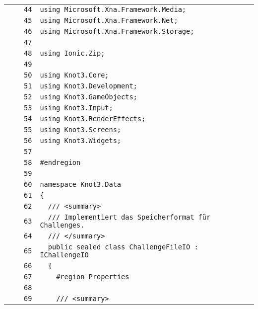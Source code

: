 \documentclass[a4paper,10pt]{article}
\begin{document}
\begin{longtable}[l]{lrrl}
\cellcolor{gray} &  & \verb~44~ & \verb~using Microsoft.Xna.Framework.Media;~\\
\cellcolor{gray} &  & \verb~45~ & \verb~using Microsoft.Xna.Framework.Net;~\\
\cellcolor{gray} &  & \verb~46~ & \verb~using Microsoft.Xna.Framework.Storage;~\\
\cellcolor{gray} &  & \verb~47~ & \verb~~\\
\cellcolor{gray} &  & \verb~48~ & \verb~using Ionic.Zip;~\\
\cellcolor{gray} &  & \verb~49~ & \verb~~\\
\cellcolor{gray} &  & \verb~50~ & \verb~using Knot3.Core;~\\
\cellcolor{gray} &  & \verb~51~ & \verb~using Knot3.Development;~\\
\cellcolor{gray} &  & \verb~52~ & \verb~using Knot3.GameObjects;~\\
\cellcolor{gray} &  & \verb~53~ & \verb~using Knot3.Input;~\\
\cellcolor{gray} &  & \verb~54~ & \verb~using Knot3.RenderEffects;~\\
\cellcolor{gray} &  & \verb~55~ & \verb~using Knot3.Screens;~\\
\cellcolor{gray} &  & \verb~56~ & \verb~using Knot3.Widgets;~\\
\cellcolor{gray} &  & \verb~57~ & \verb~~\\
\cellcolor{gray} &  & \verb~58~ & \verb~#endregion~\\
\cellcolor{gray} &  & \verb~59~ & \verb~~\\
\cellcolor{gray} &  & \verb~60~ & \verb~namespace Knot3.Data~\\
\cellcolor{gray} &  & \verb~61~ & \verb~{~\\
\cellcolor{gray} &  & \verb~62~ & \verb~  /// <summary>~\\
\cellcolor{gray} &  & \verb~63~ & \verb~  /// Implementiert das Speicherformat für Challenges.~\\
\cellcolor{gray} &  & \verb~64~ & \verb~  /// </summary>~\\
\cellcolor{gray} &  & \verb~65~ & \verb~  public sealed class ChallengeFileIO : IChallengeIO~\\
\cellcolor{gray} &  & \verb~66~ & \verb~  {~\\
\cellcolor{gray} &  & \verb~67~ & \verb~    #region Properties~\\
\cellcolor{gray} &  & \verb~68~ & \verb~~\\
\cellcolor{gray} &  & \verb~69~ & \verb~    /// <summary>~\\

\end{longtable}
\end{document}
